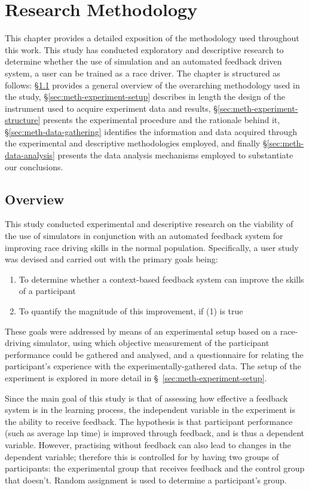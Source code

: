 \chapter{Research Methodology}
\label{chp:methodology}
This chapter provides a detailed exposition of the methodology used throughout this work. This study has conducted exploratory and descriptive research to determine whether the use of simulation and an automated feedback driven system, a user can be trained as a race driver. The chapter is structured as follows: \S\ref{sec:meth-overview} provides a general overview of the overarching methodology used in the study, \S\ref{sec:meth-experiment-setup} describes in length the design of the instrument used to acquire experiment data and results, \S\ref{sec:meth-experiment-structure} presents the experimental procedure and the rationale behind it, \S\ref{sec:meth-data-gathering} identifies the information and data acquired through the experimental and descriptive methodologies employed, and finally \S\ref{sec:meth-data-analysis} presents the data analysis mechanisms employed to substantiate our conclusions.
%
%
\section{Overview}
\label{sec:meth-overview}
This study conducted experimental and descriptive research on the viability of the use of simulators in conjunction with an automated feedback system for improving race driving skills in the normal population. Specifically, a user study was devised and carried out with the primary goals being:
\begin{enumerate}
	\item To determine whether a context-based feedback system can improve the skills of a participant
	\item To quantify the magnitude of this improvement, if (1) is true
\end{enumerate}

These goals were addressed by means of an experimental setup based on a race-driving simulator, using which objective measurement of the participant performance could be gathered and analysed, and a questionnaire for relating the participant's experience with the experimentally-gathered data. The setup of the experiment is explored in more detail in \S~\ref{sec:meth-experiment-setup}.

Since the main goal of this study is that of assessing how effective a feedback system is in the learning process, the independent variable in the experiment is the ability to receive feedback. The hypothesis is that participant performance (such as average lap time) is improved through feedback, and is thus a dependent variable. However, practising without feedback can also lead to changes in the dependent variable; therefore this is controlled for by having two groups of participants: the experimental group that receives feedback and the control group that doesn't. Random assignment is used to determine a participant's group.

